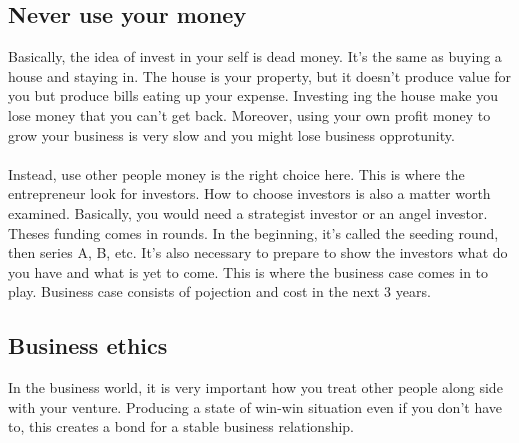 \documentclass[a4paper, 11pt]{article} %
\begin{document}
\subsection*{Never use your money}
Basically, the idea of invest in your self is dead money. It's the same as buying a house and staying in. The house is your property, but it doesn't produce value for you but produce bills eating up your expense. Investing ing the house make you lose money that you can't get back. Moreover, using your own profit money to grow your business is very slow and you might lose business opprotunity.
\\
\\
Instead, use other people money is the right choice here. This is where the entrepreneur look for investors. How to choose investors is also a matter worth examined. Basically, you would need a strategist investor or an angel investor. Theses funding comes in rounds. In the beginning, it's called the seeding round, then series A, B, etc. It's also necessary to prepare to show the investors what do you have and what is yet to come. This is where the business case comes in to play. Business case consists of pojection and cost in the next 3 years.
\subsection*{Business ethics}
In the business world, it is very important how you treat other people along side with your venture. Producing a state of win-win situation even if you don't have to, this creates a bond for a stable business relationship. 
\end{document}
